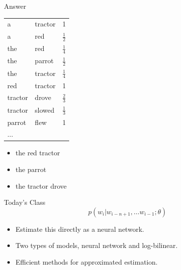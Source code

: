 \documentclass{beamer}
\begin{document}
\begin{frame}[allowframebreaks]{Answer}
  \begin{table}
    \centering
    \begin{tabular}{lll}
      \toprule
      \midrule
      a & tractor & 1\\
      a & red & $\frac{1}{2}$\\
      \midrule
      the & red & $\frac{1}{4}$\\
      the & parrot & $\frac{1}{2}$\\
      the & tractor &$\frac{1}{4}$ \\
      \midrule
      red & tractor & 1 \\
      \midrule
      tractor & drove & $\frac{2}{3}$ \\
      tractor & slowed & $\frac{1}{3}$ \\
      \midrule
      parrot & flew & 1 \\
      $\ldots$ & & \\
      \bottomrule
    \end{tabular}
  \end{table}

  \begin{itemize}
  \item the red tractor 
  \item the parrot 
  \item the tractor drove 
  \end{itemize}
  

\end{frame}


\begin{frame}{Today's Class }
  \[ p(w_i | w_{i-n+1}, \ldots w_{i-1}; \theta) \] 

  \begin{itemize}
  \item Estimate this directly as a neural network.
    \air 

  \item Two types of models, neural network and log-bilinear. 
    \air 

  \item Efficient methods for approximated estimation.
  \end{itemize}
\end{frame}
\end{document}
